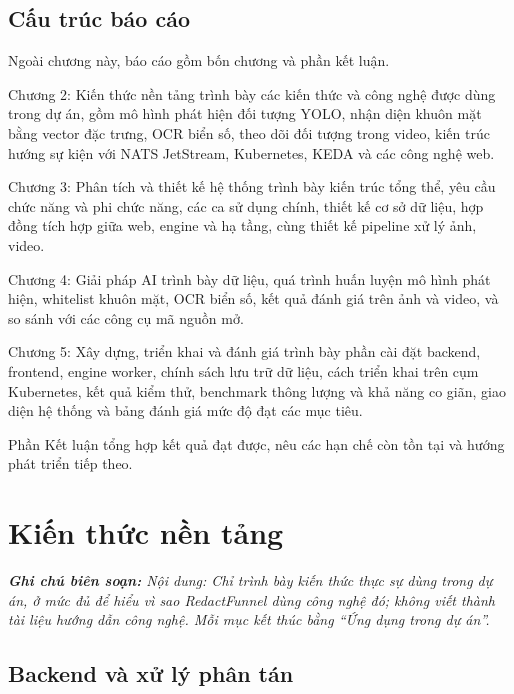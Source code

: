 \documentclass[a4paper,12pt]{article}
\begin{document}
\subsection{Cấu trúc báo cáo}

Ngoài chương này, báo cáo gồm bốn chương và phần kết luận.

Chương 2: Kiến thức nền tảng trình bày các kiến thức và công nghệ được dùng trong dự án, gồm mô hình phát hiện đối tượng YOLO, nhận diện khuôn mặt bằng vector đặc trưng, OCR biển số, theo dõi đối tượng trong video, kiến trúc hướng sự kiện với NATS JetStream, Kubernetes, KEDA và các công nghệ web.

Chương 3: Phân tích và thiết kế hệ thống trình bày kiến trúc tổng thể, yêu cầu chức năng và phi chức năng, các ca sử dụng chính, thiết kế cơ sở dữ liệu, hợp đồng tích hợp giữa web, engine và hạ tầng, cùng thiết kế pipeline xử lý ảnh, video.

Chương 4: Giải pháp AI trình bày dữ liệu, quá trình huấn luyện mô hình phát hiện, whitelist khuôn mặt, OCR biển số, kết quả đánh giá trên ảnh và video, và so sánh với các công cụ mã nguồn mở.

Chương 5: Xây dựng, triển khai và đánh giá trình bày phần cài đặt backend, frontend, engine worker, chính sách lưu trữ dữ liệu, cách triển khai trên cụm Kubernetes, kết quả kiểm thử, benchmark thông lượng và khả năng co giãn, giao diện hệ thống và bảng đánh giá mức độ đạt các mục tiêu.

Phần Kết luận tổng hợp kết quả đạt được, nêu các hạn chế còn tồn tại và hướng phát triển tiếp theo.


\clearpage
\section{Kiến thức nền tảng}
\label{sec:ch2}

{\small\itshape\noindent\textbf{Ghi chú biên soạn:} Nội dung: Chỉ trình bày kiến thức thực sự dùng trong dự án, ở mức đủ để hiểu vì sao RedactFunnel dùng công nghệ đó; không viết thành tài liệu hướng dẫn công nghệ. Mỗi mục kết thúc bằng ``Ứng dụng trong dự án''.\par\vspace{6pt}}





\subsection{Backend và xử lý phân tán}
\end{document}
